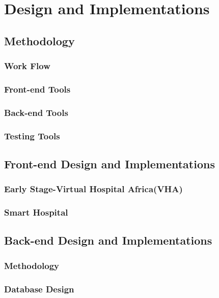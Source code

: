 %
%
\chapter{Design and Implementations}
\label{chap:D&I}

\section{Methodology}
\label{sec:sec01}

\subsection{Work Flow}
\label{subsec:subsec01}

\subsection{Front-end Tools}
\label{subsec:FETools}


\subsection{Back-end Tools}
\label{subsec:subsec04}

\subsection{Testing Tools}
\label{subsec:subsec05}

\section{Front-end Design and Implementations}
\label{sec:sec02}

\subsection{Early Stage-Virtual Hospital Africa(VHA)}
\label{subsec:subsec01}



\subsection{Smart Hospital}
\label{subsec:subsec02}


\section{Back-end Design and Implementations}
\label{sec:sec03}

\subsection{Methodology}
\label{subsec:Methodology}


\subsection{Database Design}
\label{subsec:Database Design}
